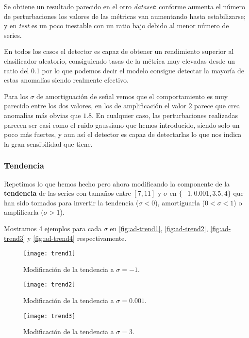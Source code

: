 Se obtiene un resultado parecido en el otro \emph{dataset}: conforme aumenta el número de perturbaciones los valores de las métricas van aumentando hasta estabilizarse; y en \emph{test} es un poco inestable con un ratio bajo debido al menor número de series.

En todos los casos el detector es capaz de obtener un rendimiento superior al clasificador aleatorio, consiguiendo tasas de la métrica muy elevadas desde un ratio del 0.1 por lo que podemos decir el modelo consigue detectar la mayoría de estas anomalías siendo realmente efectivo.

Para los $\sigma$ de amortiguación de señal vemos que el comportamiento es muy parecido entre los dos valores, en los de amplificación el valor $2$ parece que crea anomalías más obvias que $1.8$. En cualquier caso, las perturbaciones realizadas parecen ser casi como el ruido gaussiano que hemos introducido, siendo solo un poco más fuertes, y aun así el detector es capaz de detectarlas lo que nos indica la gran sensibilidad que tiene.

\subsubsection{Tendencia}

Repetimos lo que hemos hecho pero ahora modificando la componente de la \textbf{tendencia} de las series con tamaños entre $[7, 11]$ y $\sigma$ en $\{-1, 0.001, 3.5, 4\}$ que han sido tomados para invertir la tendencia ($\sigma < 0$), amortiguarla ($0 < \sigma < 1$) o amplificarla ($\sigma > 1$).

Mostramos 4 ejemplos para cada $\sigma$ en \autoref{fig:ad-trend1}, \autoref{fig:ad-trend2}, \autoref{fig:ad-trend3} y \autoref{fig:ad-trend4} respectivamente.

\begin{figure}[htpb]
  \centering
  \texttt{[image: trend1]}
  \caption{Modificación de la tendencia a $\sigma = -1$.}
  \label{fig:ad-trend1}
\end{figure}

\begin{figure}[htpb]
  \centering
  \texttt{[image: trend2]}
  \caption{Modificación de la tendencia a $\sigma = 0.001$.}
  \label{fig:ad-trend2}
\end{figure}


\begin{figure}[htpb]
  \centering
  \texttt{[image: trend3]}
  \caption{Modificación de la tendencia a $\sigma = 3$.}
  \label{fig:ad-trend3}
\end{figure}


